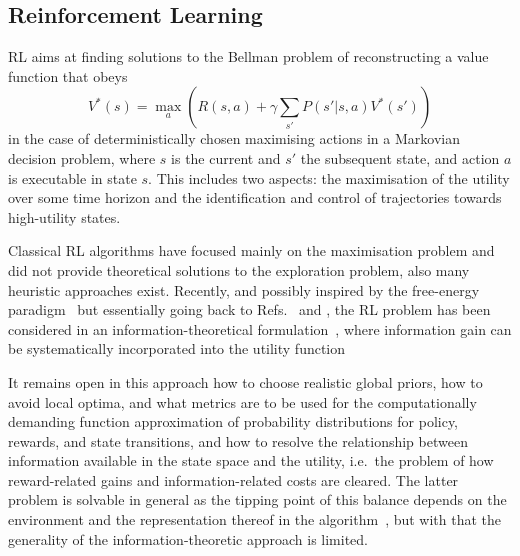 \documentclass{article}
\begin{document}
\subsection{Reinforcement Learning}

RL aims at finding solutions to the Bellman problem of reconstructing a value function that obeys
\begin{equation}
	V^*(s)=\max_a \left(R(s,a) + \gamma \sum_{s'} P(s'|s,a) V^*(s')\right)
\end{equation} 
in the case of deterministically chosen maximising actions in a Markovian decision problem, where
$s$ is the current and $s'$ the subsequent state, and action $a$ is executable in state $s$.
This includes two aspects: the maximisation of the utility over some time horizon and the 
identification and control of trajectories towards high-utility states. 

Classical RL algorithms
have focused mainly on the maximisation problem and did not provide theoretical 
solutions to the exploration problem, also many heuristic approaches exist.
Recently, and possibly inspired by the free-energy paradigm~\cite{friston2006free}
but essentially going back to Refs.~\cite{still2012information} and \cite{bialek1999predictive}, 
the RL problem has been considered in an information-theoretical 
formulation~\cite{tschantz2020reinforcement}, 
where information gain can be  systematically incorporated into the utility function

It remains open in this approach how to choose realistic global priors, how to avoid
local optima, and what metrics are to be used for the computationally 
demanding function approximation of probability distributions for policy, rewards, and 
state transitions, and how to resolve the relationship between information available 
in the state space and the utility, i.e.~the problem of how reward-related gains and 
information-related costs are cleared. The latter problem is solvable in general as
the tipping point of this balance depends on the environment and the representation thereof
in the algorithm~\cite{smith2018evaluation}, but with that the generality of the 
information-theoretic approach is limited.
\end{document}
